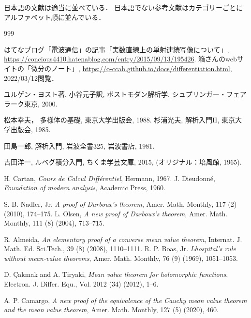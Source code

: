 \documentclass[leqno, a4paper, 12pt]{jsarticle}
\begin{document}
日本語の文献は適当に並べている．
日本語でない参考文献はカテゴリーごとにアルファベット順に並んでいる．
\begin{thebibliography}{999}

はてなブログ「電波通信」の記事「実数直線上の単射連続写像について」, 
\url{https://concious4410.hatenablog.com/entry/2015/09/13/195426}. 
箱さんのwebサイトの「微分のノート」, 
\url{
https://o-ccah.github.io/docs/differentiation.html}, 
2022/03/12閲覧．

ユルゲン・ヨスト著, 
小谷元子訳,
ポストモダン解析学, 
シュプリンガー・フェアラーク東京, 
2000. 

松本幸夫，
多様体の基礎, 
東京大学出版会, 
1988. 
杉浦光夫, 
解析入門II, 
東京大学出版会, 
1985. 

田島一郎, 
解析入門, 
岩波全書325, 
岩波書店, 1981. 

吉田洋一,
ルベグ積分入門,
ちくま学芸文庫, 2015, 
(オリジナル：培風館, 1965). 


H. Cartan, 
\textit{Cours de Calcul Diff\'{e}rentiel}, 
Hermann, 1967. 
J. Dieudonn\'{e}, 
\textit{Foundation of modern analysis}, 
Academic Press, 1960. 



S. B. Nadler, Jr. 
\textit{A proof of Darboux's theorem}, 
Amer. Math. Monthly, 
117 (2) (2010), 174--175. 
L. Olsen, 
\textit{
A new proof of Darboux's theorem}, 
Amer. Math. Monthly, 
111 (8) (2004), 
713--715. 


 R. Almeida, 
 \textit{An elementary proof of a converse mean value theorem}, 
 Internat. J. Math. Ed. Sci.Tech., 39 (8) (2008), 1110--1111.
R. P. Boas, Jr.
\textit{Lhospital's rule without mean-value theorems}, 
Amer. Math. Monthly, 
76 (9) (1969), 1051--1053. 


D. \c{C}akmak
and 
A. Tiryaki, 
\textit{
Mean value theorem for holomorphic functions}, 
Electron. J. Differ. Equ., Vol. 2012 (34) (2012), 1--6. 


A. P. Camargo, 
\textit{
A new proof of the equivalence of the Cauchy mean value theorem and the mean value theorem}, 
Amer. Math. Monthly, 
127 (5) (2020), 460.




\end{thebibliography}
\end{document}
